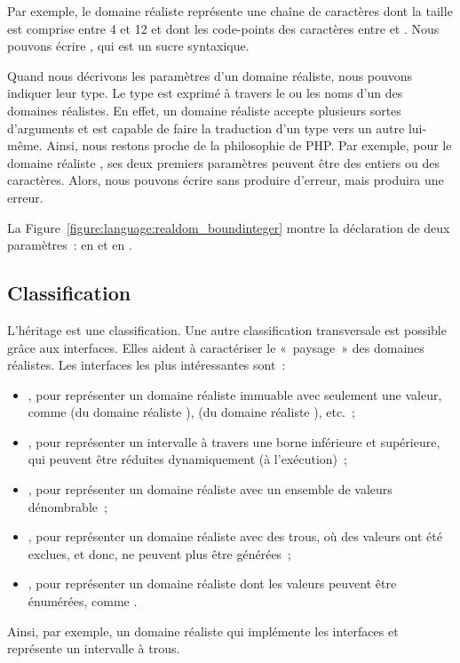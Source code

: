 Par exemple, le domaine réaliste 
représente une chaîne de caractères dont la taille est comprise entre 4 et 12 et
dont les code-points des caractères entre  et . Nous
pouvons écrire , qui est un sucre syntaxique.

Quand nous décrivons les paramètres d'un domaine réaliste, nous pouvons indiquer
leur type. Le type est exprimé à travers le ou les noms d'un des domaines
réalistes. En effet, un domaine réaliste accepte plusieurs sortes d'arguments et
est capable de faire la traduction d'un type vers un autre lui-même. Ainsi, nous
restons proche de la philosophie de PHP. Par exemple, pour le domaine réaliste
, ses deux premiers paramètres peuvent être des entiers ou des
caractères. Alors, nous pouvons écrire  sans
produire d'erreur, mais  produira une erreur.

La Figure~\ref{figure:language:realdom_boundinteger} montre la déclaration de
deux paramètres~:  en  et  en .

\subsection{Classification}
\label{subsection:language:realdom:classification}

L'héritage est une classification. Une autre classification transversale est
possible grâce aux interfaces. Elles aident à caractériser le «~paysage~» des
domaines réalistes. Les interfaces les plus intéressantes sont~:

\begin{itemize}

\item {}, pour représenter un domaine réaliste immuable avec
seulement une valeur, comme  (du domaine réaliste ),
 (du domaine réaliste ), etc.~;

\item {}, pour représenter un intervalle à travers une borne
inférieure et supérieure, qui peuvent être réduites dynamiquement (à
l'exécution)~;

\item {}, pour représenter un domaine réaliste avec un ensemble de
valeurs dénombrable~;

\item {}, pour représenter un domaine réaliste avec des trous, \ie
où des valeurs ont été exclues, et donc, ne peuvent plus être générées~;

\item {}, pour représenter un domaine réaliste dont les valeurs
peuvent être énumérées, comme .

\end{itemize}

Ainsi, par exemple, un domaine réaliste qui implémente les interfaces
 et  représente un intervalle à trous.
